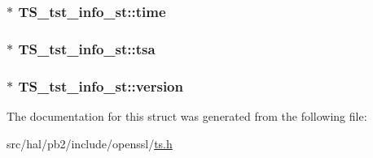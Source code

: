 \subsubsection[{\texorpdfstring{time}{time}}]{$\ast$ T\+S\+\_\+tst\+\_\+info\+\_\+st\+::time}\hypertarget{struct_t_s__tst__info__st_a8b6a1201796f7e1b5b961ee86ab55681}{}\label{struct_t_s__tst__info__st_a8b6a1201796f7e1b5b961ee86ab55681}
\subsubsection[{\texorpdfstring{tsa}{tsa}}]{$\ast$ T\+S\+\_\+tst\+\_\+info\+\_\+st\+::tsa}\hypertarget{struct_t_s__tst__info__st_aa4b23c96f4a2a053c56b46f7622a4a2c}{}\label{struct_t_s__tst__info__st_aa4b23c96f4a2a053c56b46f7622a4a2c}
\subsubsection[{\texorpdfstring{version}{version}}]{$\ast$ T\+S\+\_\+tst\+\_\+info\+\_\+st\+::version}\hypertarget{struct_t_s__tst__info__st_ad0e7ab1536c6e4ecae58bc6f0538b4dc}{}\label{struct_t_s__tst__info__st_ad0e7ab1536c6e4ecae58bc6f0538b4dc}


The documentation for this struct was generated from the following file\+:\begin{DoxyCompactItemize}
\item 
src/hal/pb2/include/openssl/\hyperlink{ts_8h}{ts.\+h}\end{DoxyCompactItemize}
